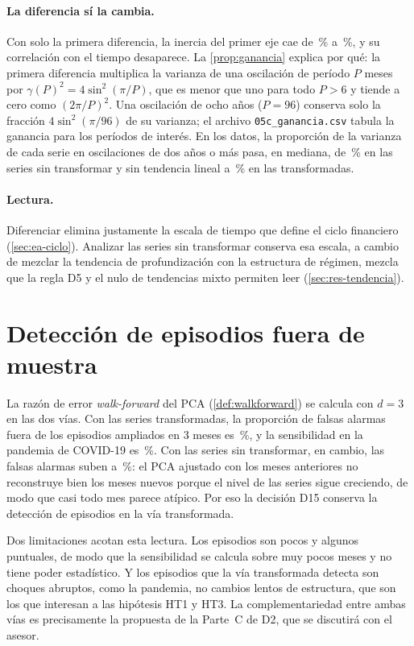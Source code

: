 \paragraph{La diferencia sí la cambia.} Con solo la primera diferencia, la inercia del primer
eje cae de \inerciaPCUnoNiveles\,\% a
\inerciaPCUnoDiferencia{}\,\%,
y su correlación con el tiempo desaparece. La \cref{prop:ganancia} explica por qué: la primera
diferencia multiplica la varianza de una oscilación de período $P$ meses por
$\gamma(P)^2=4\sin^2(\pi/P)$, que es menor que uno para todo $P>6$ y tiende a cero como
$(2\pi/P)^2$. Una oscilación de ocho años ($P=96$) conserva solo la fracción $4\sin^2(\pi/96)$
de su varianza; el archivo \texttt{05c\_ganancia.csv} tabula la ganancia para los períodos de
interés. En los datos, la proporción de la varianza de cada serie en oscilaciones de dos años o
más pasa, en mediana, de
\espectroLentoMedianaNivelesSinTendencia\,\%
en las series sin transformar y sin tendencia lineal a
\espectroLentoMedianaTransformadas\,\%
en las transformadas.

\paragraph{Lectura.} Diferenciar elimina justamente la escala de tiempo que define el ciclo
financiero (\cref{sec:ea-ciclo}). Analizar las series sin transformar conserva esa escala, a
cambio de mezclar la tendencia de profundización con la estructura de régimen, mezcla que la
regla D5 y el nulo de tendencias mixto permiten leer (\cref{sec:res-tendencia}).

\section{Detección de episodios fuera de muestra}
\label{sec:ap-deteccion}

La razón de error \emph{walk-forward} del PCA (\cref{def:walkforward}) se calcula con $d=3$ en
las dos vías. Con las series transformadas, la proporción de falsas alarmas fuera de los
episodios ampliados en 3 meses es
\falsasAlarmasTransformadasTres{}\,\%,
y la sensibilidad en la pandemia de COVID-19 es
\sensibilidadCovidTransformadasTres{}\,\%.
Con las series sin transformar, en cambio, las falsas alarmas suben a
\falsasAlarmasNivelesTres{}\,\%:
el PCA ajustado con los meses anteriores no reconstruye bien los meses nuevos porque el nivel de
las series sigue creciendo, de modo que casi todo mes parece atípico. Por eso la decisión D15
conserva la detección de episodios en la vía transformada.

Dos limitaciones acotan esta lectura. Los episodios son pocos y algunos puntuales, de modo que la
sensibilidad se calcula sobre muy pocos meses y no tiene poder estadístico. Y los episodios que
la vía transformada detecta son choques abruptos, como la pandemia, no cambios lentos de
estructura, que son los que interesan a las hipótesis HT1 y HT3. La complementariedad entre ambas
vías es precisamente la propuesta de la Parte~C de D2, que se discutirá con el asesor.
